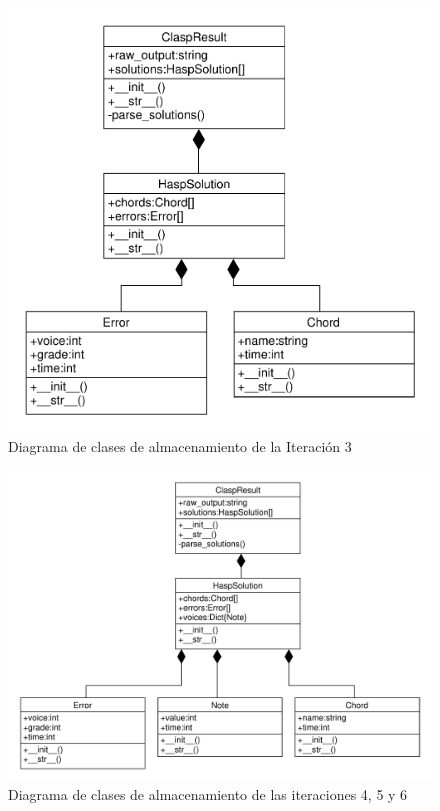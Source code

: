 \begin{figure}[th]
	\centering
	\includegraphics[width=0.8\linewidth]{imagenes/first_iters.pdf}
	\caption{Diagrama de clases de almacenamiento de la Iteración 3}
	\label{fig:class_diagram_2}
\end{figure}
\newpage
\begin{figure}[th]
	\centering
	\includegraphics[width=0.8\linewidth]{imagenes/second_iters.pdf}
	\caption{Diagrama de clases de almacenamiento de las iteraciones 4, 5 y 6}
	\label{fig:class_diagram_note}
\end{figure}
